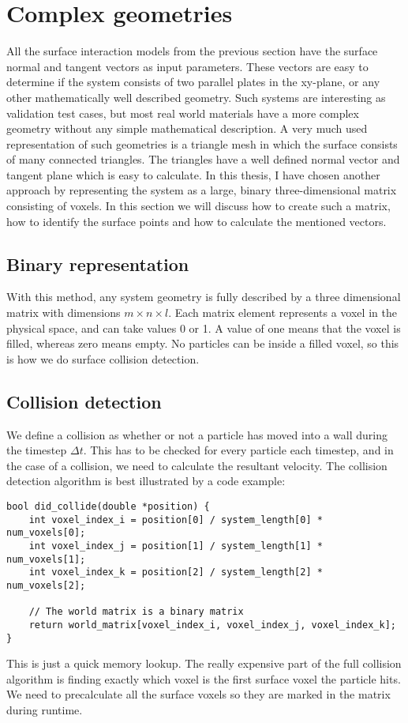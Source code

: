 \section{Complex geometries}
All the surface interaction models from the previous section have the surface normal and tangent vectors as input parameters. These vectors are easy to determine if the system consists of two parallel plates in the xy-plane, or any other mathematically well described geometry. Such systems are interesting as validation test cases, but most real world materials have a more complex geometry without any simple mathematical description. A very much used representation of such geometries is a triangle mesh in which the surface consists of many connected triangles. The triangles have a well defined normal vector and tangent plane which is easy to calculate. In this thesis, I have chosen another approach by representing the system as a large, binary three-dimensional matrix consisting of voxels. In this section we will discuss how to create such a matrix, how to identify the surface points and how to calculate the mentioned vectors.
\subsection{Binary representation}
With this method, any system geometry is fully described by a three dimensional matrix with dimensions $m\times n\times l$. Each matrix element represents a voxel in the physical space, and can take values 0 or 1. A value of one means that the voxel is filled, whereas zero means empty. No particles can be inside a filled voxel, so this is how we do surface collision detection. 
\subsection{Collision detection}
We define a collision as whether or not a particle has moved into a wall during the timestep $\Delta t$. This has to be checked for every particle each timestep, and in the case of a collision, we need to calculate the resultant velocity. The collision detection algorithm is best illustrated by a code example:
\begin{lstlisting}
bool did_collide(double *position) {
	int voxel_index_i = position[0] / system_length[0] * num_voxels[0];
	int voxel_index_j = position[1] / system_length[1] * num_voxels[1];
	int voxel_index_k = position[2] / system_length[2] * num_voxels[2];

	// The world matrix is a binary matrix
	return world_matrix[voxel_index_i, voxel_index_j, voxel_index_k];
}
\end{lstlisting}
This is just a quick memory lookup. The really expensive part of the full collision algorithm is finding exactly which voxel is the first surface voxel the particle hits. We need to precalculate all the surface voxels so they are marked in the matrix during runtime.
